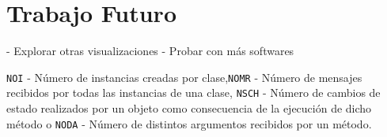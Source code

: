 \section{Trabajo Futuro}

\par 
- Explorar otras visualizaciones
- Probar con más softwares

{\tt NOI} - Número de instancias creadas por clase,{\tt NOMR} - Número de mensajes recibidos por todas las instancias de una clase, {\tt NSCH} - Número de cambios de estado realizados por un objeto como consecuencia de la ejecución de dicho método o {\tt NODA} - Número de distintos argumentos recibidos por un método. 


